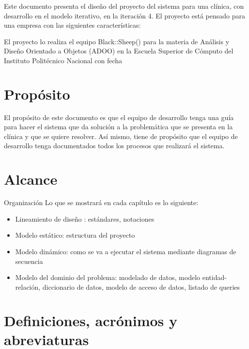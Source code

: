 Este documento presenta el diseño del proyecto del sistema para una clínica, con desarrollo en el modelo iterativo, en la iteración 4. El proyecto está pensado para una empresa con las siguientes características:

El proyecto lo realiza el equipo Black::Sheep() para la materia de Análisis y Diseño Orientado a Objetos (ADOO) en la Escuela Superior de Cómputo del Instituto Politécnico Nacional con fecha


\section{Propósito}
El propósito de este documento es que el equipo de desarrollo tenga una guía para hacer el sistema que da solución a la problemática que se presenta en la clínica y que se quiere resolver. Así mismo,  tiene de propósito que  el equipo de desarrollo tenga documentados todos los procesos que realizará el sistema.
\section{Alcance}

Organización
Lo que se mostrará en cada capítulo es lo siguiente:
\begin{itemize}
\item Lineamiento de diseño : estándares, notaciones

\item Modelo estático: estructura del proyecto

\item Modelo dinámico: como se va a ejecutar el sistema mediante diagramas de secuencia

\item Modelo del dominio del problema: modelado de datos, modelo entidad-relación, diccionario de datos, modelo de acceso de datos, listado de queries

\end{itemize}

\section{Definiciones, acrónimos y abreviaturas}

